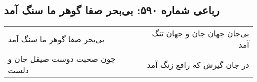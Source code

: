 \begin{center}
\section*{رباعی شماره ۵۹۰: بی‌بحر صفا گوهر ما سنگ آمد}
\label{sec:0590}
\begin{longtable}{l p{0.5cm} r}
بی‌بحر صفا گوهر ما سنگ آمد
&&
بی‌جان جهان جان و جهان تنگ آمد
\\
چون صحبت دوست صیقل جان و دلست
&&
در جان گیرش که رافع زنگ آمد
\\
\end{longtable}
\end{center}
